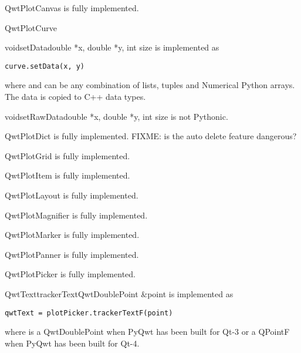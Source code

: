 \documentclass{manual}
\begin{document}
\begin{classdesc*}{QwtPlotCanvas}
  is fully implemented.
\end{classdesc*}

\begin{classdesc*}{QwtPlotCurve}

  \begin{cfuncdesc}{void}{setData}{double *x, double *y, int size}
    is implemented as
    \begin{verbatim}
curve.setData(x, y)
    \end{verbatim}
    where  and  can be any combination of lists, tuples and
    Numerical Python arrays.  The data is copied to C++ data types.
  \end{cfuncdesc}

  \begin{cfuncdesc}{void}{setRawData}{double *x, double *y, int size}
      is not Pythonic.
  \end{cfuncdesc}

\end{classdesc*}

\begin{classdesc*}{QwtPlotDict}
  is fully implemented.
  FIXME: is the auto delete feature dangerous?
\end{classdesc*}

\begin{classdesc*}{QwtPlotGrid}
  is fully implemented.
\end{classdesc*}

\begin{classdesc*}{QwtPlotItem}
  is fully implemented.
\end{classdesc*}

\begin{classdesc*}{QwtPlotLayout}
  is fully implemented.
\end{classdesc*}

\begin{classdesc*}{QwtPlotMagnifier}
  is fully implemented.
\end{classdesc*}

\begin{classdesc*}{QwtPlotMarker}
  is fully implemented.
\end{classdesc*}

\begin{classdesc*}{QwtPlotPanner}
  is fully implemented.
\end{classdesc*}

\begin{classdesc*}{QwtPlotPicker}
  is fully implemented.

  \begin{cfuncdesc}{QwtText}{trackerText}{QwtDoublePoint \&point}
    is implemented as
    \begin{verbatim}
qwtText = plotPicker.trackerTextF(point)
    \end{verbatim}
    where  is a QwtDoublePoint when PyQwt has been built for Qt-3 or
    a QPointF when PyQwt has been built for Qt-4.
  \end{cfuncdesc}

\end{classdesc*}
\end{document}
